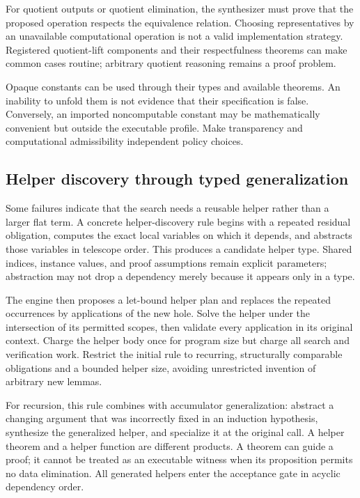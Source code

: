 \documentclass[11pt,letterpaper]{article}
\theoremstyle{definition}
\theoremstyle{remark}
\begin{document}
For quotient outputs or quotient elimination, the synthesizer must prove that the proposed operation respects the equivalence relation. Choosing representatives by an unavailable computational operation is not a valid implementation strategy. Registered quotient-lift components and their respectfulness theorems can make common cases routine; arbitrary quotient reasoning remains a proof problem.

Opaque constants can be used through their types and available theorems. An inability to unfold them is not evidence that their specification is false. Conversely, an imported noncomputable constant may be mathematically convenient but outside the executable profile. Make transparency and computational admissibility independent policy choices.

\subsection{Helper discovery through typed generalization}

Some failures indicate that the search needs a reusable helper rather than a larger flat term. A concrete helper-discovery rule begins with a repeated residual obligation, computes the exact local variables on which it depends, and abstracts those variables in telescope order. This produces a candidate helper type. Shared indices, instance values, and proof assumptions remain explicit parameters; abstraction may not drop a dependency merely because it appears only in a type.

The engine then proposes a let-bound helper plan and replaces the repeated occurrences by applications of the new hole. Solve the helper under the intersection of its permitted scopes, then validate every application in its original context. Charge the helper body once for program size but charge all search and verification work. Restrict the initial rule to recurring, structurally comparable obligations and a bounded helper size, avoiding unrestricted invention of arbitrary new lemmas.

For recursion, this rule combines with accumulator generalization: abstract a changing argument that was incorrectly fixed in an induction hypothesis, synthesize the generalized helper, and specialize it at the original call. A helper theorem and a helper function are different products. A theorem can guide a proof; it cannot be treated as an executable witness when its proposition permits no data elimination. All generated helpers enter the acceptance gate in acyclic dependency order.
\end{document}
